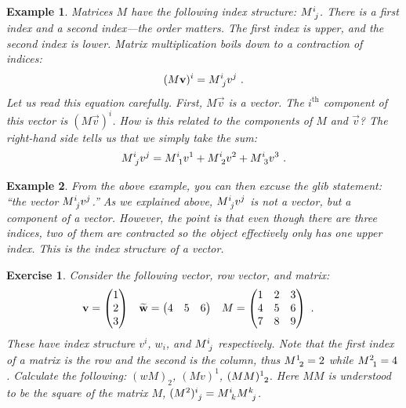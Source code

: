 \documentclass[12pt]{article}
\newtheorem{exercise}{Exercise}[section]
\newtheorem{example}{Example}[section]
\begin{document}
\begin{example}
Matrices $M$ have the following index structure: $M\aij{i}{j}$. There is a first index and a second index---the order matters. The first index is upper, and the second index is lower. Matrix multiplication boils down to a contraction of indices:
\begin{align}
    (M\vec{v})^i = M\aij{i}{j}v^j \ .
    \label{eq:matrix:mult:ith:comp}
\end{align}
Let us read this equation carefully. First, $M\vec{v}$ is a vector. The $i^\text{th}$ component of this vector is $(M\vec{v})^i$. How is this related to the components of $M$ and $\vec{v}$? The right-hand side tells us that we simply take the sum:
\begin{align}
    M\aij{i}{j}v^j = 
    M\aij{i}{1}v^1 + M\aij{i}{2}v^2  + M\aij{i}{3}v^3 \ .
\end{align}
\end{example}
\begin{example}
From the above example, you can then excuse the glib statement: ``the \emph{vector} $M\aij{i}{j}v^j$.'' As we explained above, $M\aij{i}{j}v^j$ is not a vector, but a component of a vector. However, the point is that even though there are three indices, two of them are contracted so the object effectively only has one upper index. This is the index structure of a vector.
\end{example}

\begin{exercise}
Consider the following vector, row vector, and matrix:
\begin{align}
    \mathbf{v} &=
    \begin{pmatrix}
     1 \\ 2 \\ 3   
    \end{pmatrix}
    &
    \widetilde{\mathbf{w}} &=
    \begin{pmatrix}
        4&5&6
    \end{pmatrix}
    &
    M&=
    \begin{pmatrix}
        1 & 2 & 3 \\
        4 & 5 & 6 \\
        7 & 8 & 9
    \end{pmatrix} \ .
\end{align}
These have index structure $v^i$, $w_i$, and $M\aij{i}{j}$ respectively. Note that the first index of a matrix is the row and the second is the column, thus $M\aij{1}{2} = 2$ while $M\aij{2}{1} = 4$. Calculate the following: $(wM)_2$, $(Mv)^1$, $(MM)\aij{1}{2}$. Here $MM$ is understood to be the square of the matrix $M$, $(M^2)\aij{i}{j} = M\aij{i}{k}M\aij{k}{j}$.
\end{exercise}
\end{document}
